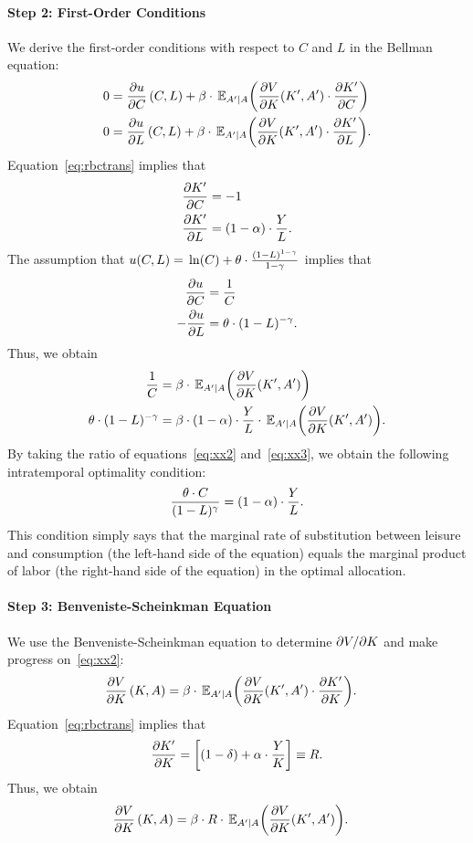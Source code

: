 \documentclass[letterpaper,12pt,leqno]{article}
\begin{document}
\paragraph{Step 2: First-Order Conditions} We derive the first-order conditions with respect to $C$ and $L$ in the Bellman equation:
\begin{align*}
0&= \pd{u}{C}\bp{C,L} +\b \cdot \E[A'|A]{\pd{V}{K}(K',A')\cdot \pd{ K'}{ C}}\\
0&=\pd{u}{L}\bp{C,L} +\b\cdot \E[A'|A]{\pd{V}{K}(K',A')\cdot \pd{ K'}{ L}}.
\end{align*}
Equation~\eqref{eq:rbctrans} implies that
\begin{align*}
\frac{\partial  K'}{\partial  C}&=-1\\
\frac{\partial  K'}{\partial  L}&=(1-\alpha)\cdot \frac{Y}{L}.
\end{align*}
The assumption that $u(C,L)=\ln{C}+\t\cdot \frac{(1-L)^{1-\g}}{1-\g}$ implies that
\begin{align*}
\frac{\partial u}{\partial C}&=\frac{1}{C}\\
-\frac{\partial u}{\partial L}&=\theta \cdot (1-L)^{-\gamma}.
\end{align*}
Thus, we obtain
\begin{align}
\frac{1}{C}&=\b\cdot \E[A'|A]{\pd{V}{K}(K',A')} \label{eq:xx2}\\
\t \cdot (1-L)^{-\g}&=\b\cdot\bp{1-\a}\cdot \frac{Y}{L}\cdot \E[A'|A]{\pd{V}{K}(K',A')}\label{eq:xx3}.
\end{align}
By taking the ratio of equations~\eqref{eq:xx2} and~\eqref{eq:xx3},  we obtain the following intratemporal optimality condition:
\begin{equation}
\frac{\theta \cdot C}{(1-L)^{\gamma}}=(1-\alpha) \cdot \frac{Y}{L} \label{eq:intra}.
\end{equation}
This condition simply says that the marginal rate of substitution between leisure and consumption (the left-hand side of the equation) equals the marginal product of labor (the right-hand side of the equation) in the optimal  allocation.

\paragraph{Step 3: Benveniste-Scheinkman Equation} We use the Benveniste-Scheinkman equation to determine $\partial V/\partial K$ and make progress on~\eqref{eq:xx2}: 
\begin{align*}
\pd{V}{K}\bp{K,A} &  =\b\cdot \E[A'|A]{\pd{V}{K}(K',A') \cdot  \pd{ K'}{ K}}.
\end{align*}
Equation~\eqref{eq:rbctrans} implies that
\[\frac{\partial  K'}{\partial  K}= \left[ (1-\delta)+\alpha  \cdot \frac{Y}{K} \right]\equiv R.\]
Thus, we obtain 
\begin{align}
\pd{V}{K}\bp{K,A}&  =\b\cdot  R\cdot \E[A'|A]{\pd{V}{K}(K',A')}\label{eq:xx1}.
\end{align}
\end{document}

